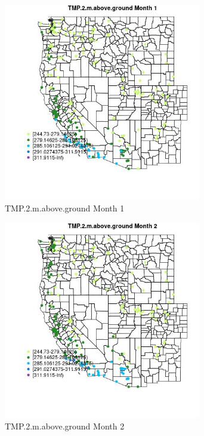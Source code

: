 \begin{figure} 
\centering  
\includegraphics[width=0.77\textwidth]{Code_Outputs/Report_ML_input_PM25_Step4_part_e_de_duplicated_aveswNAs_MapObsMo1TMP2maboveground.jpg} 
\caption{\label{fig:Report_ML_input_PM25_Step4_part_e_de_duplicated_aveswNAsMapObsMo1TMP2maboveground}TMP.2.m.above.ground Month 1} 
\end{figure} 
 

\clearpage 

\begin{figure} 
\centering  
\includegraphics[width=0.77\textwidth]{Code_Outputs/Report_ML_input_PM25_Step4_part_e_de_duplicated_aveswNAs_MapObsMo2TMP2maboveground.jpg} 
\caption{\label{fig:Report_ML_input_PM25_Step4_part_e_de_duplicated_aveswNAsMapObsMo2TMP2maboveground}TMP.2.m.above.ground Month 2} 
\end{figure} 
 

